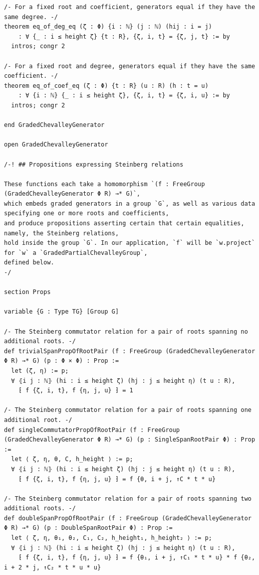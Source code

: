 \begin{Verbatim}
/- For a fixed root and coefficient, generators equal if they have the same degree. -/
theorem eq_of_deg_eq (ζ : Φ) {i : ℕ} (j : ℕ) (hij : i = j)
    : ∀ {_ : i ≤ height ζ} {t : R}, {ζ, i, t} = {ζ, j, t} := by
  intros; congr 2

/- For a fixed root and degree, generators equal if they have the same coefficient. -/
theorem eq_of_coef_eq (ζ : Φ) {t : R} (u : R) (h : t = u)
    : ∀ {i : ℕ} {_ : i ≤ height ζ}, {ζ, i, t} = {ζ, i, u} := by
  intros; congr 2

end GradedChevalleyGenerator

open GradedChevalleyGenerator

/-! ## Propositions expressing Steinberg relations

These functions each take a homomorphism `(f : FreeGroup (GradedChevalleyGenerator Φ R) →* G)`,
which embeds graded generators in a group `G`, as well as various data specifying one or more roots and coefficients,
and produce propositions asserting certain that certain equalities, namely, the Steinberg relations,
hold inside the group `G`. In our application, `f` will be `w.project` for `w` a `GradedPartialChevalleyGroup`,
defined below.
-/

section Props

variable {G : Type TG} [Group G]

/- The Steinberg commutator relation for a pair of roots spanning no additional roots. -/
def trivialSpanPropOfRootPair (f : FreeGroup (GradedChevalleyGenerator Φ R) →* G) (p : Φ × Φ) : Prop :=
  let (ζ, η) := p;
  ∀ ⦃i j : ℕ⦄ (hi : i ≤ height ζ) (hj : j ≤ height η) (t u : R),
    ⁅ f {ζ, i, t}, f {η, j, u} ⁆ = 1

/- The Steinberg commutator relation for a pair of roots spanning one additional root. -/
def singleCommutatorPropOfRootPair (f : FreeGroup (GradedChevalleyGenerator Φ R) →* G) (p : SingleSpanRootPair Φ) : Prop :=
  let ⟨ ζ, η, θ, C, h_height ⟩ := p;
  ∀ ⦃i j : ℕ⦄ (hi : i ≤ height ζ) (hj : j ≤ height η) (t u : R),
    ⁅ f {ζ, i, t}, f {η, j, u} ⁆ = f {θ, i + j, ↑C * t * u}

/- The Steinberg commutator relation for a pair of roots spanning two additional roots. -/
def doubleSpanPropOfRootPair (f : FreeGroup (GradedChevalleyGenerator Φ R) →* G) (p : DoubleSpanRootPair Φ) : Prop :=
  let ⟨ ζ, η, θ₁, θ₂, C₁, C₂, h_height₁, h_height₂ ⟩ := p;
  ∀ ⦃i j : ℕ⦄ (hi : i ≤ height ζ) (hj : j ≤ height η) (t u : R),
    ⁅ f {ζ, i, t}, f {η, j, u} ⁆ = f {θ₁, i + j, ↑C₁ * t * u} * f {θ₂, i + 2 * j, ↑C₂ * t * u * u}


\end{Verbatim}
